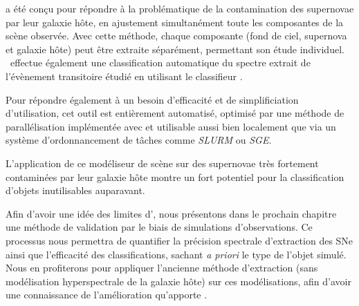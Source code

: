 \documentclass[../main/main.tex]{subfiles}
\begin{document}
\hypergal a été conçu pour répondre à la problématique de la
contamination des supernovae par leur galaxie hôte, en ajustement
simultanément toute les composantes de la scène observée. Avec cette
méthode, chaque composante (fond de ciel, supernova et galaxie hôte)
peut être extraite séparément, permettant son étude
individuel. \hypergal\ effectue également une classification automatique du
spectre extrait de l'évènement transitoire étudié en utilisant le
classifieur . 

Pour répondre également à un besoin d'efficacité et de simplificiation
d'utilisation, cet outil est entièrement
automatisé, optimisé par une méthode de parallélisation implémentée
avec  et utilisable aussi bien localement que via un système
d'ordonnancement de tâches comme \textit{SLURM} ou \textit{SGE}. 

L'application de ce modéliseur de scène sur des supernovae très
fortement contaminées par leur galaxie hôte montre un fort potentiel
pour la classification d'objets inutilisables auparavant.

Afin d'avoir une idée des limites d'\hypergal, nous présentons dans le
prochain chapitre une méthode de validation par le biais de simulations
d'observations. Ce processus nous permettra de quantifier la précision
spectrale d'extraction des SNe ainsi que l'efficacité des
classifications, sachant \textit{a priori} le type de l'objet
simulé. Nous en profiterons pour appliquer l'ancienne méthode
d'extraction (sans modélisation hyperspectrale de la galaxie hôte) sur
ces modélisations, afin d'avoir une connaissance de l'amélioration
qu'apporte \hypergal.


%
%
\end{document}
